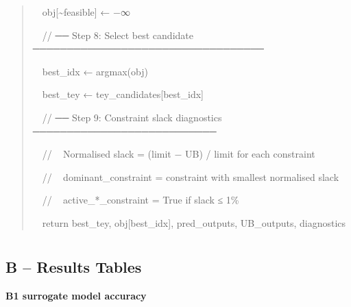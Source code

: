 \documentclass[11pt]{article}
\begin{document}
\begin{quote}
~~obj{[}\textasciitilde feasible{]} ← −∞

~~// ── Step 8: Select best candidate ──────────────────────────────────

~~best\_idx ← argmax(obj)

~~best\_tey ← tey\_candidates{[}best\_idx{]}

~~// ── Step 9: Constraint slack diagnostics ───────────────────────────

~~// ~ Normalised slack = (limit − UB) / limit for each constraint

~~// ~ dominant\_constraint = constraint with smallest normalised slack

~~// ~ active\_*\_constraint = True if slack ≤ 1\%

~~return best\_tey, obj{[}best\_idx{]}, pred\_outputs, UB\_outputs,
diagnostics
\end{quote}

\section{}\label{section-20}

\section{}\label{section-21}

\subsection{B -- Results Tables}\label{b-results-tables}

\textbf{B1 surrogate model accuracy}

\section{}\label{section-22}
\end{document}
